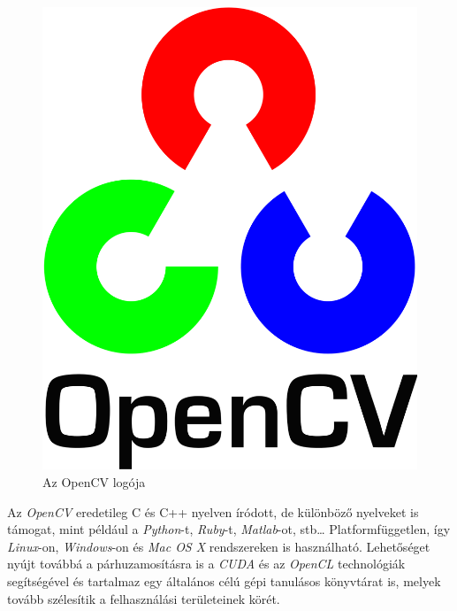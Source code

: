 \begin{figure}[h]
\centering
\includegraphics[width=2.4truecm, height=2.96truecm]{images/OpenCV-logo.png}
\caption{Az OpenCV logója}
\label{fig:opencv}
\end{figure}

Az \textit{OpenCV} eredetileg C és C++ nyelven íródott, de különböző nyelveket is támogat, mint például a \textit{Python}-t, \textit{Ruby}-t, \textit{Matlab}-ot, stb\ldots
Platformfüggetlen, így \textit{Linux}-on, \textit{Windows}-on és \textit{Mac OS X} rendszereken is használható. Lehetőséget nyújt továbbá a párhuzamosításra is a \textit{CUDA} és az \textit{OpenCL} technológiák segítségével és tartalmaz egy általános célú gépi tanulásos könyvtárat is, melyek tovább szélesítik a felhasználási területeinek körét. \cite{bradski2008learning}

